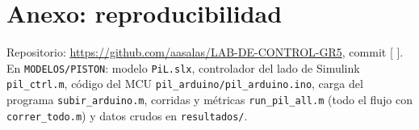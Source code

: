 \documentclass[conference]{IEEEtran}
\begin{document}
\appendix
\section*{Anexo: reproducibilidad}
Repositorio: \url{https://github.com/aasalas/LAB-DE-CONTROL-GR5}, commit [ ]. En \texttt{MODELOS/PISTON}: modelo \texttt{PiL.slx}, controlador del lado de Simulink \texttt{pil\_ctrl.m}, código del MCU \texttt{pil\_arduino/pil\_arduino.ino}, carga del programa \texttt{subir\_arduino.m}, corridas y métricas \texttt{run\_pil\_all.m} (todo el flujo con \texttt{correr\_todo.m}) y datos crudos en \texttt{resultados/}.
\end{document}
